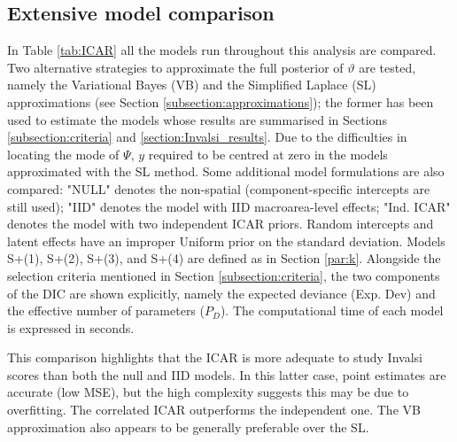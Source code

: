 \documentclass[openany, 11pt, oneside]{book}
\begin{document}
\begin{subappendices}

\section{Extensive model comparison} \label{Appendix:A}
In Table \ref{tab:ICAR} all the models run throughout this analysis are compared. Two alternative strategies to approximate the full posterior of $\vartheta$ are tested, namely the Variational Bayes (VB) and the Simplified Laplace (SL) approximations (see Section \ref{subsection:approximations}); the former has been used to estimate the models whose results are summarised in Sections \ref{subsection:criteria} and \ref{section:Invalsi_results}. Due to the difficulties in locating the mode of $\Psi$, $y$ required to be centred at zero in the models approximated with the SL method. Some additional model formulations are also compared: "NULL" denotes the non-spatial (component-specific intercepts are still used); "IID" denotes the model with IID macroarea-level effects; "Ind. ICAR" denotes the model with two independent ICAR priors. Random intercepts and latent effects have an improper Uniform prior on the standard deviation. Models  S+(1), S+(2), S+(3), and S+(4)  are defined as in Section \ref{par:k}. Alongside the selection criteria mentioned in Section \ref{subsection:criteria}, the two components of the DIC are shown explicitly, namely the expected deviance (Exp. Dev) and the effective number of parameters ($P_D$). The computational time of each model is expressed in seconds. 

This comparison highlights that the ICAR is more adequate to study Invalsi scores than both the null and IID models. In this latter case, point estimates are accurate (low MSE), but the high complexity suggests this may be due to overfitting. The correlated ICAR outperforms the independent one. The VB approximation also appears to be generally preferable over the SL.

 
\begin{table}[ht]
\centering
{}
\end{table}
\end{subappendices}
\end{document}
